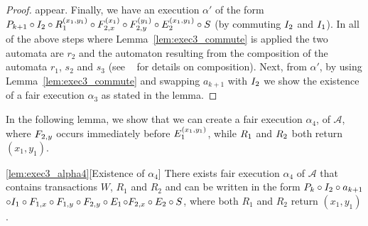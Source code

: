 {\begin{proof}
appear. Finally, we have an  execution $\alpha'$ of the form 
$ \finiteprefixA{k}{k+1} \circ  \fragt{I_2}{\alpha''}{} \circ 
\frage{R_1}{}{x_1, y_1}
\circ \fragt{F_{2,x}}{\alpha'}{x_1} \circ \fragt{F_{2,y}}{\alpha'}{y_1} \circ \fragt{E_2}{\alpha_3'}{x_1, y_1}
\circ \fragt{S}{\alpha'}{}$ (by commuting $\fragt{I_2}{\alpha_2}{}$ and $\fragt{I_1}{\alpha_2}{}$). In all of the above steps where 
Lemma~\ref{lem:exec3_commute} is applied the two automata are $r_2$ and the automaton resulting from the composition of the automata $r_1$, $s_2$ and $s_3$ (see ~\cite{Lynch1996} for details on composition).
Next, from $\alpha'$, by using Lemma~\ref{lem:exec3_commute}  and swapping $a_{k+1}$ with $\fragt{I_2}{\alpha_2}{}$ we show the existence  of  a fair execution 
 $\alpha_3$  as stated in the lemma.
\end{proof}
}

In the following lemma, we show that we can create a fair execution $\alpha_4$, of $\mathcal{A}$, where 
$\fragt{F_{2,y}}{\alpha_4}{}$ occurs immediately before  $ \fragt{E_1}{\alpha_4}{x_1, y_1}$, while $\fragt{R_1}{\alpha_4}{}$ and 
$\fragt{R_2}{\alpha_4}{}$ both return 
$(x_1, y_1)$.
\begin{lemma*}\ref{lem:exec3_alpha4}[Existence of $\alpha_4$]  
\sloppy There exists  fair execution $\alpha_4$  of $\mathcal{A}$ that contains transactions $W$, $R_1$ and $R_2$ and  can be written in the form
$ \finiteprefixA{k-1}{k} \circ \fragt{I_2}{\alpha_4}{}  \circ a_{k+1} $$ \circ \fragt{I_1}{\alpha_4}{}
\circ \fragn{F_{1,x}}{\alpha_4}{x_1} \circ   \fragn{F_{1,y}}{\alpha_4}{y_1} 
\circ \fragn{F_{2,y}}{\alpha_4}{y_1} 
\circ \fragn{E_1}{\alpha_4}{x_1, y_1}
$$\circ \fragn{F_{2,x}}{\alpha_4}{x_1} \circ  \fragn{E_2}{\alpha_4}{x_1, y_1}\circ \fragt{S}{\alpha_4}{}$, where both $R_1$ and $R_2$ return $(x_1, y_1)$.
\end{lemma*}

